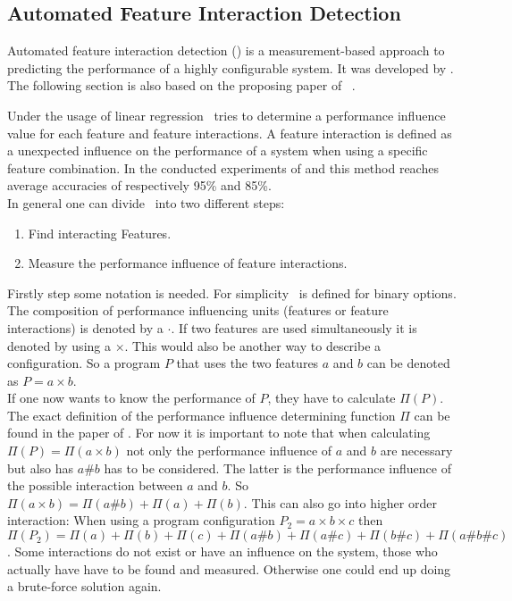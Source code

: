 

\subsection{Automated Feature Interaction Detection}\label{sec:AFID}

Automated feature interaction detection (\AFID) is a measurement-based approach to predicting the performance of a highly configurable system.
It was developed by \citet{AutomatedFeatureDetectionSiegmund2012}. The following section is also based on the proposing paper of \AFID~\cite{AutomatedFeatureDetectionSiegmund2012}. 

Under the usage of linear regression \AFID~tries to determine a performance influence value for each feature and feature interactions. A feature interaction is defined as a unexpected influence on the performance of a system when using a specific feature combination.
In the conducted experiments of \citet{AutomatedFeatureDetectionSiegmund2012} and \citet{CostEfficientSampling_Gou_Siegmund_2015} this method reaches average accuracies of  respectively 95\% and 85\%.
\\
\noindent
In general one can divide \AFID~into two different steps:
\begin{enumerate}
	\item Find interacting Features.
	\item Measure the performance influence of feature interactions.
\end{enumerate}
Firstly step some notation is needed. For simplicity \AFID~is defined for binary options.
The composition of performance influencing units (features or feature interactions) is denoted by a $\cdot$. If two features are used simultaneously it is denoted by using a $\times$. This would also be another way to describe a configuration. So a program $P$ that uses the two features $a$ and $b$ can be denoted as $P= a \times b$.\\
If one now wants to know the performance of $P$, they have to calculate $\Pi(P)$. The exact definition of the performance influence determining function $\Pi$ can be found in the paper of \citet{AutomatedFeatureDetectionSiegmund2012}. For now it is important to note that when calculating $\Pi(P)=\Pi(a \times b)$ not only the performance influence of $a$ and $b$ are necessary but also has $a\#b$ has to be considered. The latter is the performance influence of the possible interaction between $a$ and $b$. So $\Pi(a \times b) = \Pi(a\#b) + \Pi(a) + \Pi(b)$. This can also go into higher order interaction: When using a program configuration $P_2 = a \times b \times c$ then $\Pi(P_2) = \Pi(a) +  \Pi(b) +  \Pi(c) +  \Pi(a\#b) +  \Pi(a\#c) +  \Pi(b\#c) +  \Pi(a\#b\#c)$. Some interactions do not exist or have an influence on the system, those who actually have have to be found and measured. Otherwise one could end up doing a brute-force solution again.\\\\


